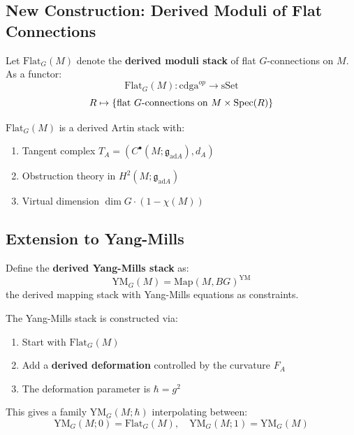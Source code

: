 \subsection{New Construction: Derived Moduli of Flat Connections}

\begin{definition}
Let $\text{Flat}_G(M)$ denote the \textbf{derived moduli stack} of flat $G$-connections on $M$. As a functor:
\[
\text{Flat}_G(M): \text{cdga}^{op} \to \text{sSet}
\]
\[
R \mapsto \{\text{flat $G$-connections on $M \times \operatorname{Spec}(R)$}\}
\]
\end{definition}

\begin{theorem}
$\text{Flat}_G(M)$ is a derived Artin stack with:
\begin{enumerate}
    \item Tangent complex $T_A = (C^\bullet(M; \mathfrak{g}_{\text{ad}A}), d_A)$
    \item Obstruction theory in $H^2(M; \mathfrak{g}_{\text{ad}A})$
    \item Virtual dimension $\dim G \cdot (1 - \chi(M))$
\end{enumerate}
\end{theorem}

\subsection{Extension to Yang-Mills}

\begin{definition}
Define the \textbf{derived Yang-Mills stack} as:
\[
\text{YM}_G(M) = \text{Map}(M, BG)^{\text{YM}}
\]
the derived mapping stack with Yang-Mills equations as constraints.
\end{definition}

\begin{construction}
The Yang-Mills stack is constructed via:
\begin{enumerate}
    \item Start with $\text{Flat}_G(M)$
    \item Add a \textbf{derived deformation} controlled by the curvature $F_A$
    \item The deformation parameter is $\hbar = g^2$
\end{enumerate}
This gives a family $\text{YM}_G(M; \hbar)$ interpolating between:
\[
\text{YM}_G(M; 0) = \text{Flat}_G(M), \quad \text{YM}_G(M; 1) = \text{YM}_G(M)
\]
\end{construction}

